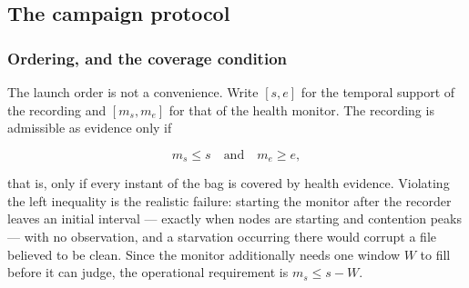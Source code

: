 \subsection{The campaign protocol}
\label{ssec:camp:protocole}

\subsubsection{Ordering, and the coverage condition}

The launch order is not a convenience. Write $[s,e]$ for the temporal support
of the recording and $[m_s,m_e]$ for that of the health monitor. The recording
is admissible as evidence only if

\begin{equation}
  m_s \le s \quad\text{and}\quad m_e \ge e,
  \label{eq:camp:couverture}
\end{equation}

that is, only if every instant of the bag is covered by health evidence.
Violating the left inequality is the realistic failure: starting the monitor
after the recorder leaves an initial interval --- exactly when nodes are
starting and contention peaks --- with no observation, and a starvation
occurring there would corrupt a file believed to be clean. Since the monitor
additionally needs one window $W$ to fill before it can judge, the operational
requirement is $m_s \le s - W$.

